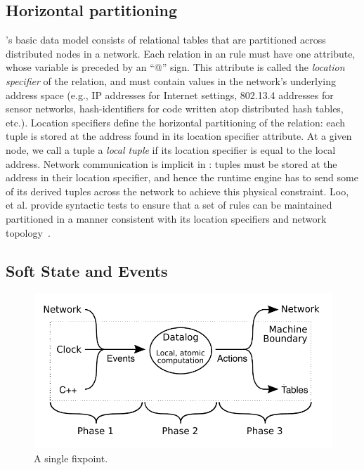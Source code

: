 \subsection{Horizontal partitioning}

\OVERLOG's basic data model consists of relational tables that are partitioned
across distributed nodes in a network.  Each relation in an \OVERLOG rule must
have one attribute, whose variable is preceded by an ``@'' sign.  This
attribute is called the {\em location specifier} of the relation, and must
contain values in the network's underlying address space (e.g., IP addresses
for Internet settings, 802.13.4 addresses for sensor networks, hash-identifiers
for code written atop distributed hash tables, etc.).  Location specifiers
define the horizontal partitioning of the relation: each tuple is stored at the
address found in its location specifier attribute.  At a given node, we call a
tuple a {\em local tuple} if its location specifier is equal to the local
address.  Network communication is implicit in \OVERLOG: tuples must be stored
at the address in their location specifier, and hence the runtime engine has to
send some of its derived tuples across the network to achieve this physical
constraint.  Loo, et al.  provide syntactic tests to ensure that a set of rules
can be maintained partitioned in a manner consistent with its location
specifiers and network topology~\cite{loo-sigmod06}.


\subsection{Soft State and Events}

\begin{figure} 
\ssp
\begin{center}
\includegraphics[scale=0.75]{figures/event_loop}
\caption{\label{ch:p2:fig:fixpoint}A single \OVERLOG fixpoint.}
\end{center} 
\end{figure}

